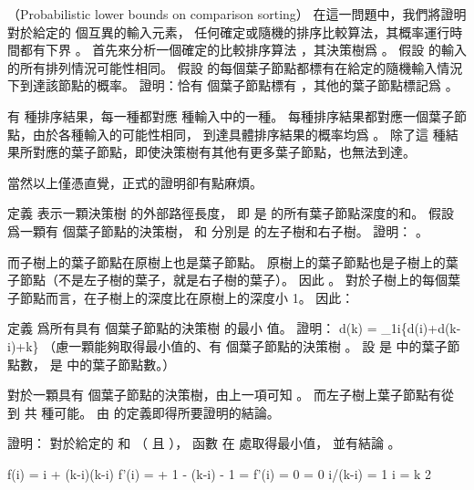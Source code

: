\startsubject[
  title={Problems},
]

\startPROBLEM
（Probabilistic lower bounds on comparison sorting）
在這一問題中，我們將證明對於給定的  個互異的輸入元素，
任何確定或隨機的排序比較算法，其概率運行時間都有下界 。
首先來分析一個確定的比較排序算法 ，其決策樹爲 。
假設  的輸入的所有排列情況可能性相同。
\startigBase[a]
\startitem
假設  的每個葉子節點都標有在給定的隨機輸入情況下到達該節點的概率。
證明：恰有  個葉子節點標有 ，其他的葉子節點標記爲 。
\stopitem

\startANSWER
有  種排序結果，每一種都對應  種輸入中的一種。
每種排序結果都對應一個葉子節點，由於各種輸入的可能性相同，
到達具體排序結果的概率均爲 。
除了這  種結果所對應的葉子節點，即使決策樹有其他有更多葉子節點，也無法到達。

當然以上僅憑直覺，正式的證明卻有點麻煩。
\stopANSWER

\startitem
定義  表示一顆決策樹  的外部路徑長度，
即  是  的所有葉子節點深度的和。
假設  爲一顆有  個葉子節點的決策樹，
  和  分別是  的左子樹和右子樹。
證明：
\startformula
{}。
\stopformula
\stopitem

\startANSWER
而子樹上的葉子節點在原樹上也是葉子節點。
原樹上的葉子節點也是子樹上的葉子節點（不是左子樹的葉子，就是右子樹的葉子）。
因此 。
對於子樹上的每個葉子節點而言，在子樹上的深度比在原樹上的深度小 1。
因此：
\startformula
{}
\stopformula
\stopANSWER

\startitem
定義  爲所有具有  個葉子節點的決策樹  的最小  值。
證明：
\startformula
d(k) = \min_{1\le i}\left\{d(i)+d(k-i)+k\right\}
\stopformula
（\hint 慮一顆能夠取得最小值的、有  個葉子節點的決策樹 。
設  是  中的葉子節點數，  是  中的葉子節點數。）
\stopitem

\startANSWER
對於一顆具有  個葉子節點的決策樹，由上一項可知 。
而左子樹上葉子節點有從  到  共  種可能。
由  的定義即得所要證明的結論。
\stopANSWER

\startitem
證明：  對於給定的  和  （ 且 ），
函數  在  處取得最小值，
並有結論 。
\stopitem

\startANSWER
\startformula\startmathalignment
\NC f(i) \NC= i + (k-i)\lg(k-i) \NR
\NC f'(i) \NC=  + 1 - \lg(k-i) - 1 = \lg{} \NR
\NC f'(i) = 0 \NC \Leftrightarrow \lg{} = 0 \Rightarrow i/(k-i) = 1 \Rightarrow i = \frac k 2 \NR
\stopmathalignment\stopformula

